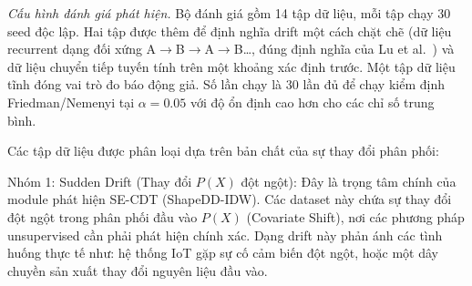 \textit{Cấu hình đánh giá phát hiện.} Bộ đánh giá gồm 14 tập dữ liệu, mỗi tập chạy 30 seed độc lập. Hai tập được thêm để định nghĩa drift một cách chặt chẽ (dữ liệu recurrent dạng đối xứng A$\to$B$\to$A$\to$B\dots, đúng định nghĩa của Lu et al.~\cite{lu2018learning}) và dữ liệu chuyển tiếp tuyến tính trên một khoảng xác định trước. Một tập dữ liệu tĩnh đóng vai trò đo báo động giả. Số lần chạy là 30 lần đủ để chạy kiểm định Friedman/Nemenyi tại $\alpha = 0.05$ với độ ổn định cao hơn cho các chỉ số trung bình.

Các tập dữ liệu được phân loại dựa trên bản chất của sự thay đổi phân phối:

Nhóm 1: Sudden Drift (Thay đổi $P(X)$ đột ngột): Đây là trọng tâm chính của module phát hiện SE-CDT (ShapeDD-IDW). Các dataset này chứa sự thay đổi đột ngột trong phân phối đầu vào $P(X)$ (Covariate Shift), nơi các phương pháp unsupervised cần phải phát hiện chính xác. Dạng drift này phản ánh các tình huống thực tế như: hệ thống IoT gặp sự cố cảm biến đột ngột, hoặc một dây chuyền sản xuất thay đổi nguyên liệu đầu vào.
